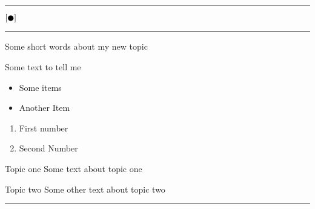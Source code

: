 \documentclass[landscape]{article}
\title{}
\author{}
\newcommand{\myline}{\vspace{4pt}\hrule  \vspace{4pt}}
\newcommand{\legalblob}{\ensuremath{ \left[ \newmoon \right] } \xspace}
\newenvironment{topic}[1]{
	\noindent \textbf{\textsc{\color{harvardcrimson}{#1}}}
	\noindent \hspace{-3.5pt}
}{
	\myline
}
\newenvironment{tellme}[1]{
	\noindent \textbf{\textit{\color{harvardblue}{#1}}}
	\begin{adjustwidth}{9pt}{}
}{
	\end{adjustwidth}
}
\newenvironment{compactitem}{
	\begin{itemize}[leftmargin=*,labelsep=5pt]
}{
	\end{itemize}
}
\newenvironment{compactenum}{
	\begin{enumerate}[leftmargin=*,labelsep=5pt]
}{
	\end{enumerate}
}
\newenvironment{compactdesc}{
	\begin{description}[leftmargin=1em,labelsep=0.7em, font=\normalfont\itshape]
}{
	\end{description}
}
\begin{document}
	\footnotesize

	\begin{multicols*}{3}

	\hfill
		\vspace{-1\baselineskip}
	\hfill
	
	\myline
		\vspace{-0.2cm}
		\begin{center}
			\LARGE \textsc{\legalblob} 
		\end{center}
		\vspace{-0.2cm}
	\myline 
	
	\begin{topic}{A New Topic} 
		Some short words about my new topic

		\begin{tellme}{This is the first tell me block}
			Some text to tell me

			\begin{compactitem}
				\item Some items
				\item Another Item
			\end{compactitem}

			\begin{compactenum}
				\item First number
				\item Second Number
			\end{compactenum}

			\begin{compactdesc}
				\item[Topic one] Some text about topic one
				\item[Topic two] Some other text about topic two
			\end{compactdesc}

		\end{tellme}
	\end{topic}

\end{multicols*}
\end{document}
